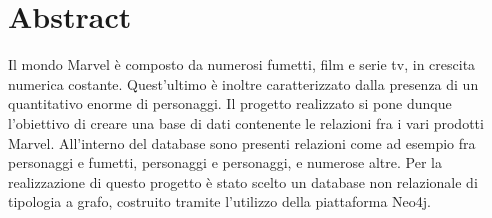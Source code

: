 \documentclass[
12pt, %
a4paper, %
oneside, %
headinclude,footinclude, %
BCOR5mm, %
]{scrartcl}
\title{\normalfont\spacedallcaps{Marvel Graph Database}} %
\author{\spacedlowsmallcaps{Fabrizio Cominetti, Davide Abete, Ruben Agazzi}} %
\date{} %
\begin{document}

\renewcommand{\sectionmark}[1]{\markright{\spacedlowsmallcaps{#1}}} %
\lehead{\mbox{\llap{\small\thepage\kern1em\color{halfgray} \vline}\color{halfgray}\hspace{0.5em}\rightmark\hfil}} %

\pagestyle{scrheadings} %


\maketitle %

\setcounter{tocdepth}{2} %

\tableofcontents %



\section*{Abstract} %

Il mondo Marvel è composto da numerosi fumetti, film e serie tv, in crescita numerica costante. Quest'ultimo è inoltre caratterizzato dalla presenza di un quantitativo enorme di personaggi.
Il progetto realizzato si pone dunque l'obiettivo di creare una base di dati contenente le relazioni fra i vari prodotti Marvel. All'interno del database sono presenti relazioni come ad esempio fra personaggi e fumetti, personaggi e personaggi, e numerose altre. Per la realizzazione di questo progetto è stato scelto un database non relazionale di tipologia a grafo, costruito tramite l'utilizzo della piattaforma Neo4j.
\end{document}
